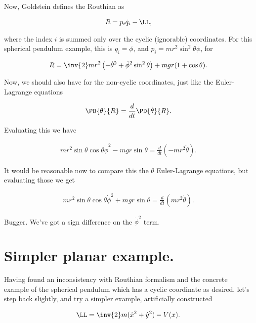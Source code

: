 Now, Goldstein defines the Routhian as

\begin{align}\label{eqn:goldsteinRouth:9}
R = p_i \dot{q}_i - \LL,
\end{align}

where the index $i$ is summed only over the cyclic (ignorable) coordinates.  For this spherical pendulum example, this is $q_i = \phi$, and $p_i = m r^2 \sin^2 \theta \dot{\phi}$, for

\begin{align}\label{eqn:goldsteinRouth:10}
R = \inv{2} m r^2 \left( -\dot{\theta}^2 + \dot{\phi}^2 \sin^2 \theta \right) + m g r ( 1 + \cos\theta ).
\end{align}

Now, we should also have for the non-cyclic coordinates, just like the Euler-Lagrange equations 

\begin{align}\label{eqn:goldsteinRouth:11}
\PD{\theta}{R} = \frac{d}{dt} \PD{\dot{\theta}}{R}.
\end{align}

Evaluating this we have

\begin{align}\label{eqn:goldsteinRouth:12}
m r^2 \sin\theta \cos\theta \dot{\phi}^2 - m g r \sin\theta = \frac{d}{dt} \left( -m r^2 \dot{\theta} \right).
\end{align}

It would be reasonable now to compare this the $\theta$ Euler-Lagrange equations, but evaluating those we get

\begin{align}\label{eqn:goldsteinRouth:13}
m r^2 \sin\theta \cos\theta \dot{\phi}^2 + m g r \sin\theta = \frac{d}{dt} \left( m r^2 \dot{\theta} \right).
\end{align}

Bugger.  We've got a sign difference on the $\dot{\phi}^2$ term.

\section{Simpler planar example.}

Having found an inconsistency with Routhian formalism and the concrete example of the spherical pendulum which has a cyclic coordinate as desired, let's step back slightly, and try a simpler example, artificially constructed

\begin{align}\label{eqn:goldsteinRouth:20}
\LL = \inv{2} m (\dot{x}^2 + \dot{y}^2 ) - V(x).
\end{align}

